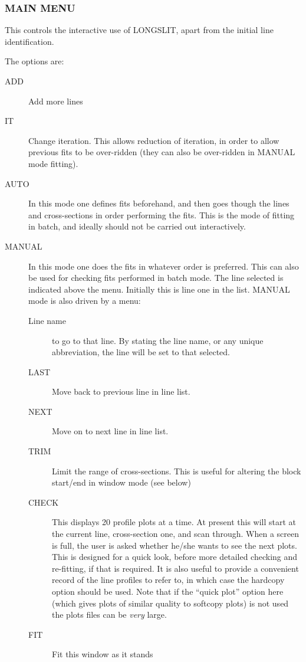 \subsubsection{MAIN MENU}
\label{long.main}

This controls the interactive use of LONGSLIT, apart from the initial
line identification.

The options are:
\begin{description}
\item[ADD] Add more lines
\item[IT] Change iteration.
This allows reduction of iteration, in order to allow previous fits to
be over-ridden (they can also be over-ridden in MANUAL mode fitting).
\item[AUTO] In this mode one defines fits beforehand, and then goes
though the lines and cross-sections in order performing the fits.
This is the mode of fitting in batch, and ideally should not be carried
out interactively.
\item[MANUAL] In this mode one does the fits in whatever order is
preferred.
This can also be used for checking fits performed in batch mode.
The line selected is indicated above the menu.
Initially this is line one in the list.
MANUAL mode is also driven by a menu:\\
\begin{description}
\item[Line name] to go to that line.
By stating the line name, or any unique abbreviation, the line will be
set to that selected.
\item[LAST] Move back to previous line in line list.
\item[NEXT] Move on to next line in line list.
\item[TRIM] Limit the range of cross-sections.
This is useful for altering the block start/end in window mode (see
below)
\item[CHECK] This displays 20 profile plots at a time.
At present this will start at the current line, cross-section one, and
scan through.
When a screen is full, the user is asked whether he/she wants to see the
next plots.
This is designed for a quick look, before more detailed checking and
re-fitting, if that is required.
It is also useful to provide a convenient record of the line profiles to
refer to, in which case the hardcopy option should be used. Note that
if the ``quick plot'' option here (which gives plots of similar quality
to softcopy plots) is not used the plots files can be {\em very} large.
\item[FIT] Fit this window as it stands

\end{description}
\end{description}

